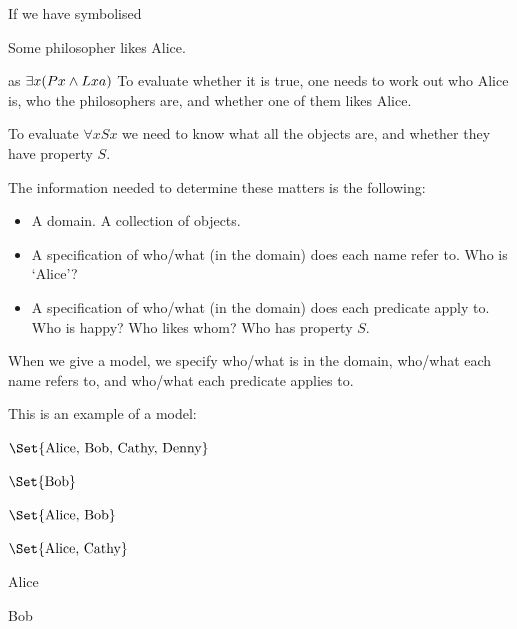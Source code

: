 If we have symbolised 
\begin{samplesent}
	\item Some philosopher likes Alice.
\end{samplesent}
as $\exists x(Px\mathbin{\wedge} Lxa)$
To evaluate whether it is true, one needs to work out who Alice is, who the philosophers are, and whether one of them likes Alice.

To evaluate $\forall x Sx$ we need to know what all the objects are, and whether they have property $S$. 

The information needed to determine these matters is the following:
\begin{itemize}
	\item A domain. A collection of objects. 
	\item A specification of who/what (in the domain) does each name refer to. Who is `Alice'?
	\item A specification of who/what (in the domain) does each predicate apply to. Who is happy? Who likes whom? Who has property $S$.
\end{itemize}





When we give a model, we specify who/what is in the domain, who/what each name refers to, and who/what each predicate applies to. 





This is an example of a model: 
\begin{interp}
	\item[\domain] $\Set{\text{Alice, Bob, Cathy, Denny}}$
	\item[\denote{H}] $\Set{\text{Bob}}$
	\item[\denote{S}] $\Set{\text{Alice, Bob}}$
	\item[\denote{C}] $\Set{\text{Alice, Cathy}}$
	\item[\denote{a}] {Alice}
	\item[\denote{b}] {Bob}
\end{interp}

